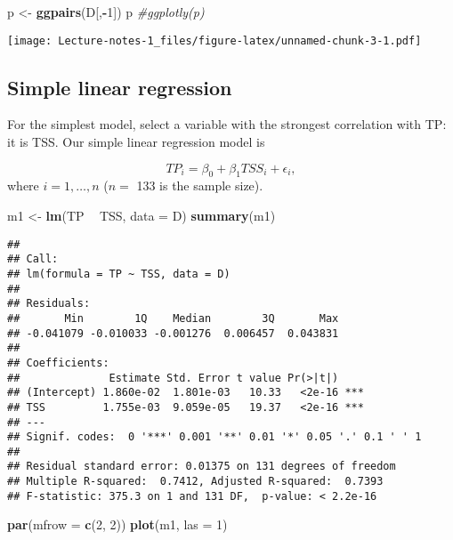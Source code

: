\documentclass[
]{book}
\newenvironment{Shaded}{\begin{snugshade}}{\end{snugshade}}
\newcommand{\CommentTok}[1]{\textcolor[rgb]{0.56,0.35,0.01}{\textit{#1}}}
\newcommand{\DataTypeTok}[1]{\textcolor[rgb]{0.13,0.29,0.53}{#1}}
\newcommand{\DecValTok}[1]{\textcolor[rgb]{0.00,0.00,0.81}{#1}}
\newcommand{\KeywordTok}[1]{\textcolor[rgb]{0.13,0.29,0.53}{\textbf{#1}}}
\newcommand{\NormalTok}[1]{#1}
\newcommand{\OperatorTok}[1]{\textcolor[rgb]{0.81,0.36,0.00}{\textbf{#1}}}
\newcommand{\StringTok}[1]{\textcolor[rgb]{0.31,0.60,0.02}{#1}}
\begin{document}
\begin{Shaded}
\begin{Highlighting}[]
\NormalTok{p <-}\StringTok{ }\KeywordTok{ggpairs}\NormalTok{(D[,}\OperatorTok{-}\DecValTok{1}\NormalTok{])}
\NormalTok{p }\CommentTok{#ggplotly(p)}
\end{Highlighting}
\end{Shaded}

\texttt{[image: Lecture-notes-1\_files/figure-latex/unnamed-chunk-3-1.pdf]}

\hypertarget{simple-linear-regression}{%
\subsection{Simple linear regression}\label{simple-linear-regression}}

For the simplest model, select a variable with the strongest correlation with TP: it is TSS.
Our simple linear regression model is

\[TP_i = \beta_0 + \beta_1 TSS_i + \epsilon_i,\]
where \(i = 1,\ldots,n\) (\(n =\) 133 is the sample size).

\begin{Shaded}
\begin{Highlighting}[]
\NormalTok{m1 <-}\StringTok{ }\KeywordTok{lm}\NormalTok{(TP }\OperatorTok{~}\StringTok{ }\NormalTok{TSS, }\DataTypeTok{data =}\NormalTok{ D)}
\KeywordTok{summary}\NormalTok{(m1)}
\end{Highlighting}
\end{Shaded}

\begin{verbatim}
## 
## Call:
## lm(formula = TP ~ TSS, data = D)
## 
## Residuals:
##       Min        1Q    Median        3Q       Max 
## -0.041079 -0.010033 -0.001276  0.006457  0.043831 
## 
## Coefficients:
##              Estimate Std. Error t value Pr(>|t|)    
## (Intercept) 1.860e-02  1.801e-03   10.33   <2e-16 ***
## TSS         1.755e-03  9.059e-05   19.37   <2e-16 ***
## ---
## Signif. codes:  0 '***' 0.001 '**' 0.01 '*' 0.05 '.' 0.1 ' ' 1
## 
## Residual standard error: 0.01375 on 131 degrees of freedom
## Multiple R-squared:  0.7412, Adjusted R-squared:  0.7393 
## F-statistic: 375.3 on 1 and 131 DF,  p-value: < 2.2e-16
\end{verbatim}

\begin{Shaded}
\begin{Highlighting}[]
\KeywordTok{par}\NormalTok{(}\DataTypeTok{mfrow =} \KeywordTok{c}\NormalTok{(}\DecValTok{2}\NormalTok{, }\DecValTok{2}\NormalTok{))}
\KeywordTok{plot}\NormalTok{(m1, }\DataTypeTok{las =} \DecValTok{1}\NormalTok{)}
\end{Highlighting}
\end{Shaded}
\end{document}
